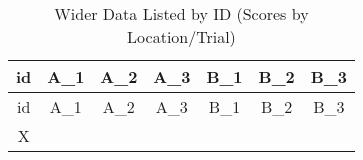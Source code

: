 \documentclass[]{book}
\begin{document}
\begin{longtable}[]{@{}ccccccc@{}}
\caption{\label{tab:wider} Wider Data Listed by ID (Scores by Location/Trial)}\tabularnewline
\toprule
\begin{minipage}[b]{0.06\columnwidth}\centering
id\strut
\end{minipage} & \begin{minipage}[b]{0.08\columnwidth}\centering
A\_1\strut
\end{minipage} & \begin{minipage}[b]{0.08\columnwidth}\centering
A\_2\strut
\end{minipage} & \begin{minipage}[b]{0.08\columnwidth}\centering
A\_3\strut
\end{minipage} & \begin{minipage}[b]{0.08\columnwidth}\centering
B\_1\strut
\end{minipage} & \begin{minipage}[b]{0.08\columnwidth}\centering
B\_2\strut
\end{minipage} & \begin{minipage}[b]{0.08\columnwidth}\centering
B\_3\strut
\end{minipage}\tabularnewline
\midrule
\endfirsthead
\toprule
\begin{minipage}[b]{0.06\columnwidth}\centering
id\strut
\end{minipage} & \begin{minipage}[b]{0.08\columnwidth}\centering
A\_1\strut
\end{minipage} & \begin{minipage}[b]{0.08\columnwidth}\centering
A\_2\strut
\end{minipage} & \begin{minipage}[b]{0.08\columnwidth}\centering
A\_3\strut
\end{minipage} & \begin{minipage}[b]{0.08\columnwidth}\centering
B\_1\strut
\end{minipage} & \begin{minipage}[b]{0.08\columnwidth}\centering
B\_2\strut
\end{minipage} & \begin{minipage}[b]{0.08\columnwidth}\centering
B\_3\strut
\end{minipage}\tabularnewline
\midrule
\endhead
\begin{minipage}[t]{0.06\columnwidth}\centering
X\strut
\end{minipage} & \begin{minipage}[t]{0.08\columnwidth}\centering

\end{minipage}
\end{longtable}
\end{document}
